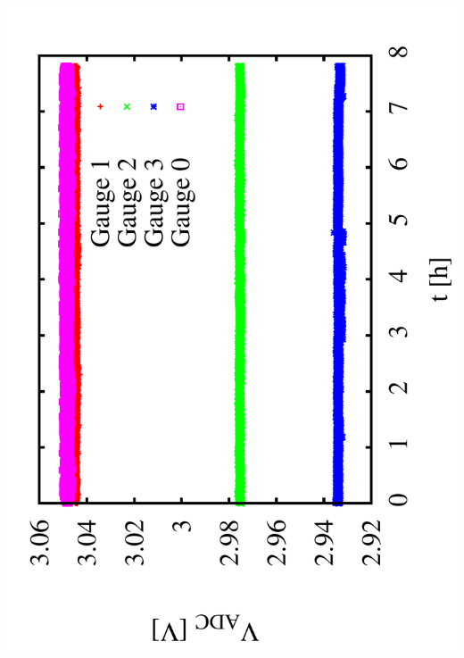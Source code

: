 \documentclass[a4paper,11pt]{book}
\begin{document}
  \hspace*{2cm}\includegraphics[angle=-90,scale=0.15]{image_ai_21c.pdf}
\end{document}
